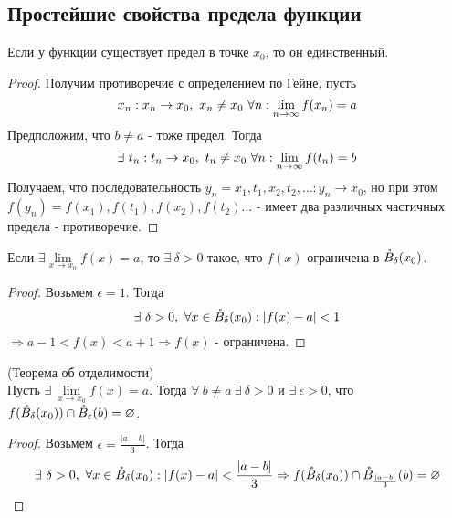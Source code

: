     \subsection{Простейшие свойства предела функции}
        \begin{theorem}
            Если у функции существует предел в точке $x_0$, то он единственный.
        \end{theorem}
        \begin{proof}
            Получим противоречие с определением по Гейне, пусть 
            \[x_n: x_n\to x_0,\ x_n\ne x_0\ \forall n: \lim\limits_{n\to \infty} f(x_n)=a\] 
            Предположим, что $b\ne a$ - тоже предел. Тогда 
            \[\exists\ t_n: t_n\to x_0,\ t_n\ne x_0\ \forall n: \lim\limits_{n\to \infty} f(t_n)=b\] 
            Получаем, что последовательность $y_n = x_1,t_1,x_2,t_2,\dots: y_n\to x_0$, но при этом $f(y_n)= f(x_1),f(t_1),f(x_2),f(t_2)\dots$ - имеет два различных частичных предела - противоречие.
        \end{proof}
        \begin{theorem}
            Если $\exists \lim\limits_{x\to x_0}f(x)=a$, то $\exists\ \delta>0$ такое, что $f(x)$ ограничена в $\mathring{B}_{\delta}(x_0)$.
        \end{theorem} 
        \begin{proof}
            Возьмем $\epsilon = 1$. Тогда
            \[\exists\ \delta>0,\ \forall x\in \mathring{B}_{\delta}(x_0): |f(x)-a|<1\]
            $\Rightarrow a-1<f(x)<a+1 \Rightarrow f(x)$ - ограничена.
        \end{proof}
        \begin{theorem} (Теорема об отделимости)\\
            Пусть $\exists\ \lim\limits_{x\to x_0}f(x)=a$. Тогда $\forall\ b\ne a\ \exists\ \delta>0$ и $\exists\ \epsilon>0$, что $f(\mathring{B}_{\delta}(x_0))\cap \mathring{B}_\varepsilon(b)=\varnothing$. 
        \end{theorem}  
        \begin{proof}
            Возьмем $\epsilon=\frac{|a-b|}{3}$. Тогда
            \[\exists\ \delta>0,\ \forall x\in \mathring{B}_{\delta}(x_0): |f(x)-a|<\frac{|a-b|}{3} \Rightarrow f(\mathring{B}_{\delta}(x_0))\cap\mathring{B}_{\frac{|a-b|}{3}}(b)=\varnothing\]
        \end{proof} 
